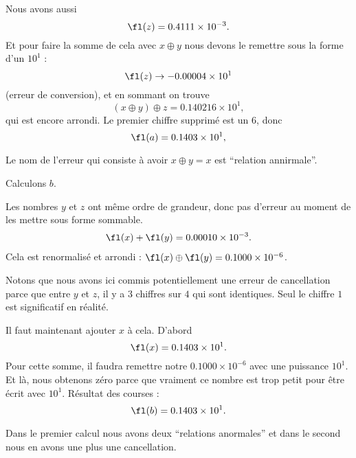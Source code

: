 \begin{example}
Nous avons aussi
\begin{equation}
    \fl(z)=0.4111\times 10^{-3}.
\end{equation}
Et pour faire la somme de cela avec \( x\oplus y\) nous devons le remettre sous la forme d'un \( 10^1\) :
\begin{equation}
    \fl(z)\to -0.00004\times 10^1
\end{equation}
(erreur de conversion), et en sommant on trouve
\begin{equation}
    (x\oplus y)\oplus z=0.140216\times 10^1,
\end{equation}
qui est encore arrondi. Le premier chiffre supprimé est un \( 6\), donc
\begin{equation}
    \fl(a)=0.1403\times 10^1,
\end{equation}

Le nom de l'erreur qui consiste à avoir \( x\oplus y=x\) est ``relation annirmale''.

Calculons \( b\).

Les nombres \( y\) et \( z\) ont même ordre de grandeur, donc pas d'erreur au moment de les mettre sous forme sommable.
\begin{subequations}
    \begin{align}
        \fl(x)+\fl(y)=0.00010\times 10^{-3}.
    \end{align}
\end{subequations}
Cela est renormalisé et arrondi : \( \fl(x)\oplus\fl(y)=0.1000\times 10^{-6}\).

Notons que nous avons ici commis potentiellement une erreur de cancellation parce que entre \( y\) et \( z\), il y a \( 3\) chiffres sur \( 4\) qui sont identiques. Seul le chiffre \( 1\) est significatif en réalité.

Il faut maintenant ajouter \( x\) à cela. D'abord
\begin{equation}
    \fl(x)=0.1403\times 10^1.
\end{equation}
Pour cette somme, il faudra remettre notre \( 0.1000\times 10^{-6}\) avec une puissance \( 10^1\). Et là, nous obtenons zéro parce que vraiment ce nombre est trop petit pour être écrit avec \( 10^1\). Résultat des courses :
\begin{equation}
    \fl(b)=0.1403\times 10^1.
\end{equation}


Dans le premier calcul nous avons deux ``relations anormales'' et dans le second nous en avons une plus une cancellation.


\end{example}
